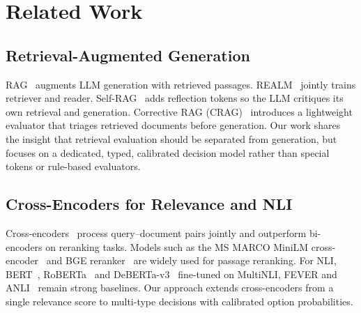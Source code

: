\documentclass[twocolumn]{ICCKjournal}
\begin{document}
\section{Related Work}
\label{sec:related}

\subsection{Retrieval-Augmented Generation}
RAG~\cite{lewis2020rag} augments LLM generation with retrieved passages. REALM~\cite{guu2020realm} jointly trains retriever and reader. Self-RAG~\cite{asai2024selfrag} adds reflection tokens so the LLM critiques its own retrieval and generation. Corrective RAG (CRAG)~\cite{yan2024corrective} introduces a lightweight evaluator that triages retrieved documents before generation. Our work shares the insight that retrieval evaluation should be separated from generation, but focuses on a dedicated, typed, calibrated decision model rather than special tokens or rule-based evaluators.

\subsection{Cross-Encoders for Relevance and NLI}
Cross-encoders~\cite{nogueira2019passage} process query--document pairs jointly and outperform bi-encoders on reranking tasks. Models such as the MS MARCO MiniLM cross-encoder~\cite{reimers2019sentence} and BGE reranker~\cite{bge_m3} are widely used for passage reranking. For NLI, BERT~\cite{devlin2019bert}, RoBERTa~\cite{liu2019roberta} and DeBERTa-v3~\cite{he2023debertav3} fine-tuned on MultiNLI, FEVER and ANLI~\cite{laurer2024less} remain strong baselines. Our approach extends cross-encoders from a single relevance score to multi-type decisions with calibrated option probabilities.
\end{document}
